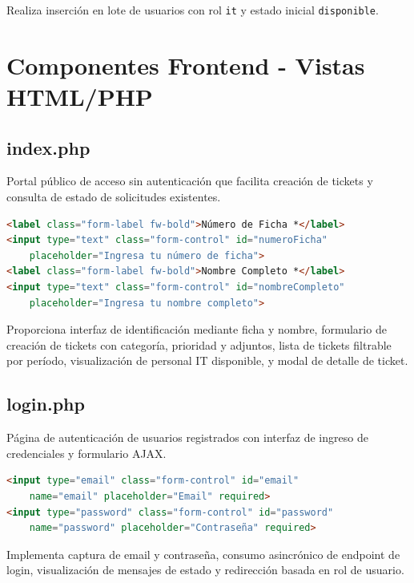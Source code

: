 \documentclass[12pt,a4paper]{article}
\begin{document}
Realiza inserción en lote de usuarios con rol \texttt{it} y estado inicial \texttt{disponible}.

\newpage

\section{Componentes Frontend - Vistas HTML/PHP}

\subsection{index.php}

Portal público de acceso sin autenticación que facilita creación de tickets y consulta de estado de solicitudes existentes.

\begin{lstlisting}[language=HTML,caption={Identificación de usuario público}]
<label class="form-label fw-bold">Número de Ficha *</label>
<input type="text" class="form-control" id="numeroFicha" 
    placeholder="Ingresa tu número de ficha">
<label class="form-label fw-bold">Nombre Completo *</label>
<input type="text" class="form-control" id="nombreCompleto" 
    placeholder="Ingresa tu nombre completo">
\end{lstlisting}

Proporciona interfaz de identificación mediante ficha y nombre, formulario de creación de tickets con categoría, prioridad y adjuntos, lista de tickets filtrable por período, visualización de personal IT disponible, y modal de detalle de ticket.

\subsection{login.php}

Página de autenticación de usuarios registrados con interfaz de ingreso de credenciales y formulario AJAX.

\begin{lstlisting}[language=HTML,caption={Formulario de login}]
<input type="email" class="form-control" id="email" 
    name="email" placeholder="Email" required>
<input type="password" class="form-control" id="password" 
    name="password" placeholder="Contraseña" required>
\end{lstlisting}

Implementa captura de email y contraseña, consumo asincrónico de endpoint de login, visualización de mensajes de estado y redirección basada en rol de usuario.
\end{document}
